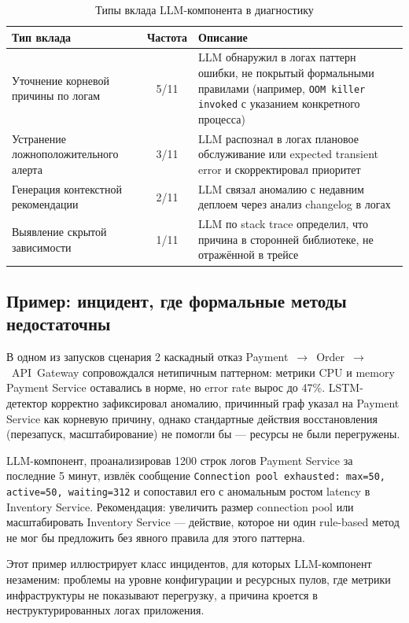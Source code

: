 \begin{table}[H]
\centering
\caption{Типы вклада LLM-компонента в диагностику}
\label{tab:llm_contribution_types}
\begin{tabular}{|p{4cm}|c|p{6cm}|}
\hline
\textbf{Тип вклада} & \textbf{Частота} & \textbf{Описание} \\
\hline
Уточнение корневой причины по логам & 5/11 & LLM обнаружил в логах паттерн ошибки, не покрытый формальными правилами (например, \texttt{OOM killer invoked} с указанием конкретного процесса) \\
\hline
Устранение ложноположительного алерта & 3/11 & LLM распознал в логах плановое обслуживание или expected transient error и скорректировал приоритет \\
\hline
Генерация контекстной рекомендации & 2/11 & LLM связал аномалию с недавним деплоем через анализ changelog в логах \\
\hline
Выявление скрытой зависимости & 1/11 & LLM по stack trace определил, что причина в сторонней библиотеке, не отражённой в трейсе \\
\hline
\end{tabular}
\end{table}

\subsection{Пример: инцидент, где формальные методы недостаточны}

В одном из запусков сценария 2 каскадный отказ \linebreak Payment~$\to$~Order~$\to$~API~Gateway сопровождался нетипичным паттерном: метрики CPU и memory Payment Service оставались в норме, но error rate вырос до 47\%. LSTM-детектор корректно зафиксировал аномалию, причинный граф указал на Payment Service как корневую причину, однако стандартные действия восстановления (перезапуск, масштабирование) не помогли бы --- ресурсы не были перегружены.

LLM-компонент, проанализировав 1200 строк логов Payment Service за последние 5 минут, извлёк сообщение \texttt{Connection pool exhausted: max=50, active=50, waiting=312} и сопоставил его с аномальным ростом latency в Inventory Service. Рекомендация: увеличить размер connection pool или масштабировать Inventory Service --- действие, которое ни один rule-based метод не мог бы предложить без явного правила для этого паттерна.

Этот пример иллюстрирует класс инцидентов, для которых LLM-компонент незаменим: проблемы на уровне конфигурации и ресурсных пулов, где метрики инфраструктуры не показывают перегрузку, а причина кроется в неструктурированных логах приложения.

